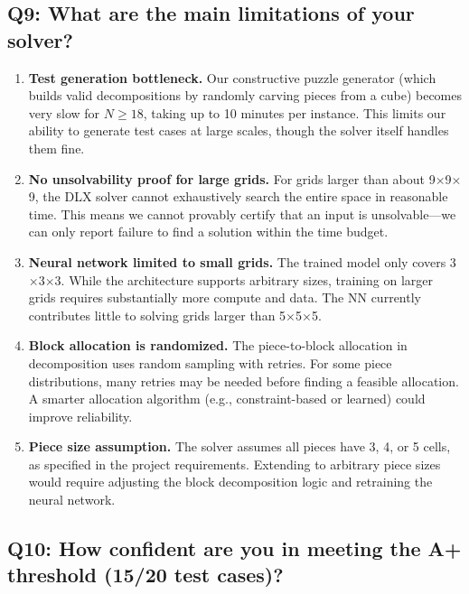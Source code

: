 \documentclass[11pt]{article}
\begin{document}
\subsection*{Q9: What are the main limitations of your solver?}

\begin{enumerate}[nosep]
  \item \textbf{Test generation bottleneck.} Our constructive puzzle generator (which builds valid decompositions by randomly carving pieces from a cube) becomes very slow for $N \geq 18$, taking up to 10 minutes per instance. This limits our ability to generate test cases at large scales, though the solver itself handles them fine.

  \item \textbf{No unsolvability proof for large grids.} For grids larger than about 9$\times$9$\times$9, the DLX solver cannot exhaustively search the entire space in reasonable time. This means we cannot provably certify that an input is unsolvable---we can only report failure to find a solution within the time budget.

  \item \textbf{Neural network limited to small grids.} The trained model only covers 3$\times$3$\times$3. While the architecture supports arbitrary sizes, training on larger grids requires substantially more compute and data. The NN currently contributes little to solving grids larger than 5$\times$5$\times$5.

  \item \textbf{Block allocation is randomized.} The piece-to-block allocation in decomposition uses random sampling with retries. For some piece distributions, many retries may be needed before finding a feasible allocation. A smarter allocation algorithm (e.g., constraint-based or learned) could improve reliability.

  \item \textbf{Piece size assumption.} The solver assumes all pieces have 3, 4, or 5 cells, as specified in the project requirements. Extending to arbitrary piece sizes would require adjusting the block decomposition logic and retraining the neural network.
\end{enumerate}

\subsection*{Q10: How confident are you in meeting the A+ threshold (15/20 test cases)?}
\end{document}
